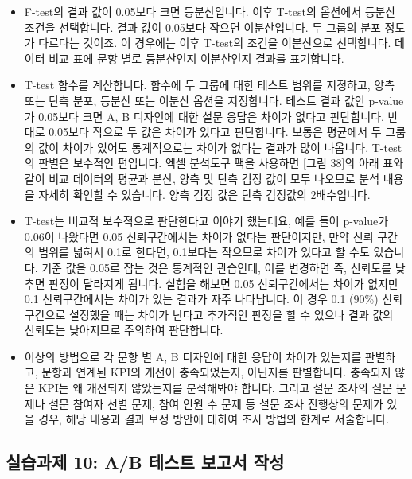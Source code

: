 \documentclass[
  letterpaper,
]{book}
\providecommand{\tightlist}{%
  \setlength{\itemsep}{0pt}\setlength{\parskip}{0pt}}\usepackage{longtable,booktabs,array}
\begin{document}
\begin{itemize}
\tightlist
\item
  F-test의 결과 값이 0.05보다 크면 등분산입니다. 이후 T-test의 옵션에서
  등분산 조건을 선택합니다. 결과 값이 0.05보다 작으면 이분산입니다. 두
  그룹의 분포 정도가 다르다는 것이죠. 이 경우에는 이후 T-test의 조건을
  이분산으로 선택합니다. 데이터 비교 표에 문항 별로 등분산인지
  이분산인지 결과를 표기합니다.
\item
  T-test 함수를 계산합니다. 함수에 두 그룹에 대한 테스트 범위를
  지정하고, 양측 또는 단측 분포, 등분산 또는 이분산 옵션을 지정합니다.
  테스트 결과 값인 p-value가 0.05보다 크면 A, B 디자인에 대한 설문
  응답은 차이가 없다고 판단합니다. 반대로 0.05보다 작으로 두 값은 차이가
  있다고 판단합니다. 보통은 평균에서 두 그룹의 값이 차이가 있어도
  통계적으로는 차이가 없다는 결과가 많이 나옵니다. T-test의 판별은
  보수적인 편입니다. 엑셀 분석도구 팩을 사용하면 {[}그림 38{]}의 아래
  표와 같이 비교 데이터의 평균과 분산, 양측 및 단측 검정 값이 모두
  나오므로 분석 내용을 자세히 확인할 수 있습니다. 양측 검정 값은 단측
  검정값의 2배수입니다.
\item
  T-test는 비교적 보수적으로 판단한다고 이야기 했는데요, 예를 들어
  p-value가 0.06이 나왔다면 0.05 신뢰구간에서는 차이가 없다는
  판단이지만, 만약 신뢰 구간의 범위를 넓혀서 0.1로 한다면, 0.1보다는
  작으므로 차이가 있다고 할 수도 있습니다. 기준 값을 0.05로 잡는 것은
  통계적인 관습인데, 이를 변경하면 즉, 신뢰도를 낮추면 판정이 달라지게
  됩니다. 실험을 해보면 0.05 신뢰구간에서는 차이가 없지만 0.1
  신뢰구간에서는 차이가 있는 결과가 자주 나타납니다. 이 경우 0.1 (90\%)
  신뢰구간으로 설정했을 때는 차이가 난다고 추가적인 판정을 할 수 있으나
  결과 값의 신뢰도는 낮아지므로 주의하여 판단합니다.
\item
  이상의 방법으로 각 문항 별 A, B 디자인에 대한 응답이 차이가 있는지를
  판별하고, 문항과 연계된 KPI의 개선이 충족되었는지, 아닌지를
  판별합니다. 충족되지 않은 KPI는 왜 개선되지 않았는지를 분석해봐야
  합니다. 그리고 설문 조사의 질문 문제나 설문 참여자 선별 문제, 참여
  인원 수 문제 등 설문 조사 진행상의 문제가 있을 경우, 해당 내용과 결과
  보정 방안에 대하여 조사 방법의 한계로 서술합니다.
\end{itemize}

\subsection{실습과제 10: A/B 테스트 보고서
작성}\label{uxc2e4uxc2b5uxacfcuxc81c-10-ab-uxd14cuxc2a4uxd2b8-uxbcf4uxace0uxc11c-uxc791uxc131}
\end{document}

